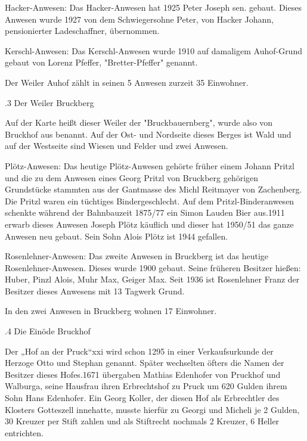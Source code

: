 Hacker-Anwesen: Das Hacker-Anwesen hat 1925 Peter Joseph sen. gebaut. Dieses
Anwesen wurde 1927 von dem Schwiegersohne Peter, von Hacker Johann,
pensionierter Ladeschaffner, übernommen.

Kerschl-Anwesen: Das Kerschl-Anwesen wurde 1910 auf damaligem Auhof-Grund gebaut
von Lorenz Pfeffer, "Bretter-Pfeffer" genannt.

Der Weiler Auhof zählt in seinen 5 Anwesen zurzeit 35 Einwohner.

.3 Der Weiler Bruckberg

Auf der Karte heißt dieser Weiler der "Bruckbauernberg", wurde also von Bruckhof
aus benannt. Auf der Ost- und Nordseite dieses Berges ist Wald und auf der
Westseite sind Wiesen und Felder und zwei Anwesen.

Plötz-Anwesen: Das heutige Plötz-Anwesen gehörte früher einem Johann Pritzl und
die zu dem Anwesen eines Georg Pritzl von Bruckberg gehörigen Grundstücke
stammten aus der Gantmasse des Michl Reitmayer von Zachenberg. Die Pritzl waren
ein tüchtiges Bindergeschlecht. Auf dem Pritzl-Binderanwesen schenkte während
der Bahnbauzeit 1875/77 ein Simon Lauden Bier aus.1911 erwarb dieses Anwesen
Joseph Plötz käuflich und dieser hat 1950/51 das ganze Anwesen neu gebaut. Sein
Sohn Alois Plötz ist 1944 gefallen.

Rosenlehner-Anwesen: Das zweite Anwesen in Bruckberg ist das heutige
Rosenlehner-Anwesen. Dieses wurde 1900 gebaut. Seine früheren Besitzer hießen:
Huber, Pinzl Alois, Muhr Max, Geiger Max. Seit 1936 ist Rosenlehner Franz der
Besitzer dieses Anwesens mit 13 Tagwerk Grund.

In den zwei Anwesen in Bruckberg wohnen 17 Einwohner.

.4 Die Einöde Bruckhof

Der „Hof an der Pruck“xxi wird schon 1295 in einer Verkaufsurkunde der Herzoge
Otto und Stephan genannt. Später wechselten öfters die Namen der Besitzer dieses
Hofes.1671 übergaben Mathias Edenhofer von Pruckhof und Walburga, seine Hausfrau
ihren Erbrechtshof zu Pruck um 620 Gulden ihrem Sohn Hans Edenhofer. Ein Georg
Koller, der diesen Hof als Erbrechtler des Klosters Gotteszell innehatte, musste
hierfür zu Georgi und Micheli je 2 Gulden, 30 Kreuzer per Stift zahlen und als
Stiftrecht nochmals 2 Kreuzer, 6 Heller entrichten.

